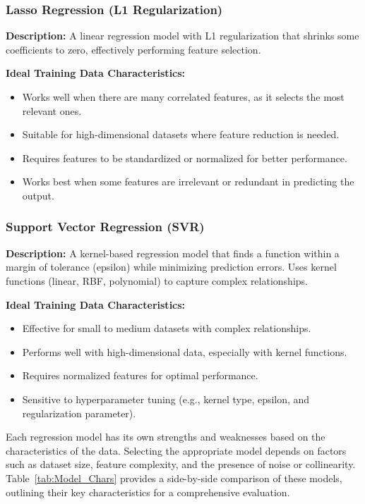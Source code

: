 \subsubsection{Lasso Regression (L1 Regularization)}
\textbf{Description:} A linear regression model with L1 regularization that shrinks some coefficients to zero, effectively performing feature selection.

\textbf{Ideal Training Data Characteristics:}
\begin{itemize}
    \item Works well when there are many correlated features, as it selects the most relevant ones.
    \item Suitable for high-dimensional datasets where feature reduction is needed.
    \item Requires features to be standardized or normalized for better performance.
    \item Works best when some features are irrelevant or redundant in predicting the output.
\end{itemize}

\subsubsection{Support Vector Regression (SVR)}
\textbf{Description:} A kernel-based regression model that finds a function within a margin of tolerance (epsilon) while minimizing prediction errors. Uses kernel functions (linear, RBF, polynomial) to capture complex relationships.

\textbf{Ideal Training Data Characteristics:}
\begin{itemize}
    \item Effective for small to medium datasets with complex relationships.
    \item Performs well with high-dimensional data, especially with kernel functions.
    \item Requires normalized features for optimal performance.
    \item Sensitive to hyperparameter tuning (e.g., kernel type, epsilon, and regularization parameter).
\end{itemize}

\noindent
Each regression model has its own strengths and weaknesses based on the characteristics of the data. Selecting the appropriate model depends on factors such as dataset size, feature complexity, and the presence of noise or collinearity. Table~\ref{tab:Model_Chars} provides a side-by-side comparison of these models, outlining their key characteristics for a comprehensive evaluation.
 
